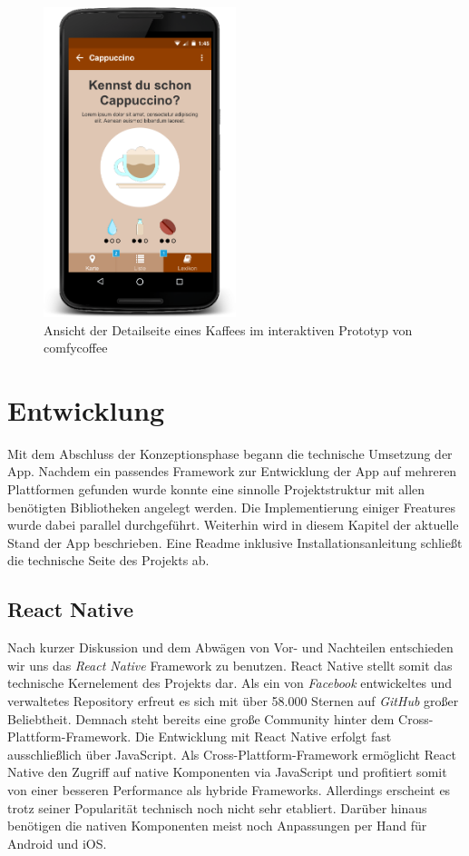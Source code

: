 \begin{figure}[H]
    \centering
		\includegraphics[width=0.5\textwidth]{Bilder/detail.png}
		\caption{Ansicht der Detailseite eines Kaffees im interaktiven Prototyp von comfycoffee}
\end{figure}






\chapter{Entwicklung}
\label{entwicklung}
Mit dem Abschluss der Konzeptionsphase begann die technische Umsetzung der App.
Nachdem ein passendes Framework zur Entwicklung der App auf mehreren Plattformen gefunden wurde konnte eine sinnolle Projektstruktur mit allen benötigten Bibliotheken angelegt werden.
Die Implementierung einiger Freatures wurde dabei parallel durchgeführt.
Weiterhin wird in diesem Kapitel der aktuelle Stand der App beschrieben.
Eine Readme inklusive Installationsanleitung schließt die technische Seite des Projekts ab.



\section{React Native}
\label{sec:reactnative}
Nach kurzer Diskussion und dem Abwägen von Vor- und Nachteilen entschieden wir uns das \emph{React Native} Framework zu benutzen.
React Native stellt somit das technische Kernelement des Projekts dar.
Als ein von \emph{Facebook} entwickeltes und verwaltetes Repository erfreut es sich mit über 58.000 Sternen auf \emph{GitHub} großer Beliebtheit.
Demnach steht bereits eine große Community hinter dem Cross-Plattform-Framework.
Die Entwicklung mit React Native erfolgt fast ausschließlich über JavaScript.
Als Cross-Plattform-Framework ermöglicht React Native den Zugriff auf native Komponenten via JavaScript und profitiert somit von einer besseren Performance als hybride Frameworks.
Allerdings erscheint es trotz seiner Popularität technisch noch nicht sehr etabliert.
Darüber hinaus benötigen die nativen Komponenten meist noch Anpassungen per Hand für Android und iOS.



